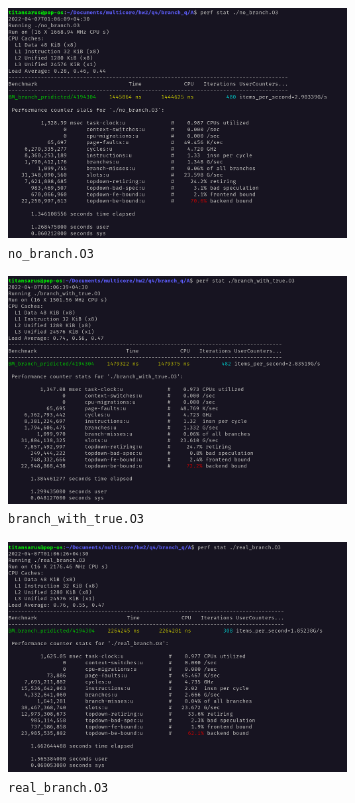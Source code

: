 \documentclass[12pt]{article}
\begin{document}
\begin{itemize}
\begin{figure}[H]
	\centering
	\includegraphics[width=0.8\textwidth]{./images/4A/no-branch-o3.png}	
	\cprotect\caption{\Verb+no_branch.O3+}
\end{figure}
			

\begin{figure}[H]
	\centering
	\includegraphics[width=0.8\textwidth]{./images/4A/branch-with-true-o3.png}	
	\cprotect\caption{\Verb+branch_with_true.O3+}
\end{figure}


\begin{figure}[H]
	\centering
	\includegraphics[width=0.8\textwidth]{./images/4A/real-branch-o3.png}	
	\cprotect\caption{\Verb+real_branch.O3+}
\end{figure}


\end{itemize}
\end{document}
